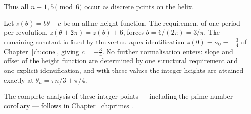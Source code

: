 Thus all $n \equiv 1,5 \pmod{6}$ occur as discrete points on the helix.

\begin{proposition}\label{prop:height-uniqueness}
Let $z(\theta) = b\theta + c$ be an affine height function. The
requirement of one period per revolution,
$z(\theta + 2\pi) = z(\theta) + 6$, forces $b = 6/(2\pi) = 3/\pi$. The
remaining constant is fixed by the vertex--apex identification
$z(0) = n_0 = -\tfrac34$ of Chapter~\ref{ch:cone}, giving
$c = -\tfrac34$. No further normalisation enters: slope and offset of
the height function are determined by one structural requirement and
one explicit identification, and with these values the integer heights
are attained exactly at $\theta_n = \pi n/3 + \pi/4$.
\end{proposition}
The complete analysis of these integer points --- including the prime number
corollary --- follows in Chapter~\ref{ch:primes}.
